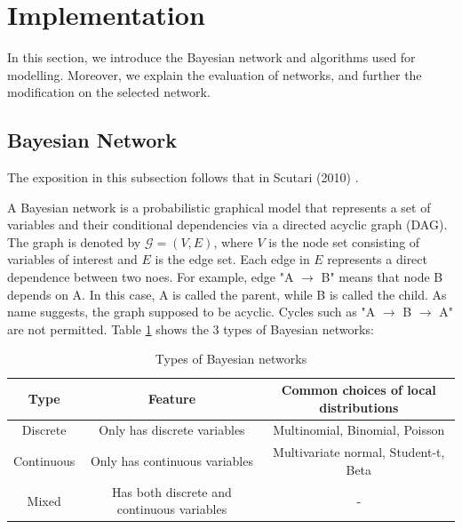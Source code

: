 \documentclass[11pt,twoside]{article}
\numberwithin{Theorem}{section}
\numberwithin{Definition}{section}
\numberwithin{Lemma}{section}
\numberwithin{Algorithm}{section}
\numberwithin{equation}{section}
\begin{document}
\clearpage

\section{Implementation}
\label{sec:implementation}

In this section, we introduce the Bayesian network and algorithms used for modelling. Moreover, we explain the evaluation of networks, and further the modification on the selected network.

\subsection{Bayesian Network}

The exposition in this subsection follows that in Scutari (2010) \cite{scutari2010learning}.

A Bayesian network is a probabilistic graphical model that represents a set of variables and their conditional dependencies via a directed acyclic graph (DAG). The graph is denoted by $\mathcal{G} = (V,E)$, where $V$ is the node set consisting of variables of interest and $E$ is the edge set. Each edge in $E$ represents a direct dependence between two noes.  For example, edge "A $\rightarrow$ B" means that node B depends on A. In this case, A is called the parent, while B is called the child. As name suggests, the graph supposed to be acyclic. Cycles such as "A $\rightarrow$ B $\rightarrow$ A" are not permitted. Table \ref{tab:bn_type} shows the 3 types of Bayesian networks:

\begin{table}[!h]
	\centering
	\begin{tabular}{|c|c|c|}
		\hline
		Type & Feature & Common choices of local distributions \\
		\hline
		Discrete & Only has discrete variables & Multinomial, Binomial, Poisson \\
		Continuous & Only has continuous variables & Multivariate normal, Student-t, Beta \\
		Mixed & Has both discrete and continuous variables & - \\
		\hline
	\end{tabular}
	\caption{Types of Bayesian networks}
	\label{tab:bn_type} 
\end{table}
\end{document}
